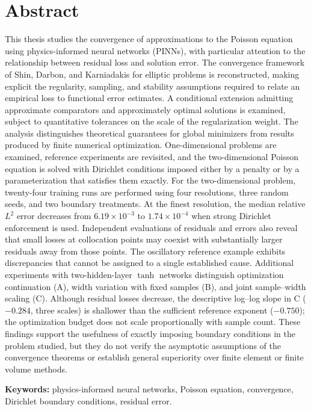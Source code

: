 \clearpage
\chapter*{\centering \large Abstract}

This thesis studies the convergence of approximations to the Poisson equation using physics-informed neural networks (PINNs), with particular attention to the relationship between residual loss and solution error. The convergence framework of Shin, Darbon, and Karniadakis for elliptic problems is reconstructed, making explicit the regularity, sampling, and stability assumptions required to relate an empirical loss to functional error estimates. A conditional extension admitting approximate comparators and approximately optimal solutions is examined, subject to quantitative tolerances on the scale of the regularization weight. The analysis distinguishes theoretical guarantees for global minimizers from results produced by finite numerical optimization. One-dimensional problems are examined, reference experiments are revisited, and the two-dimensional Poisson equation is solved with Dirichlet conditions imposed either by a penalty or by a parameterization that satisfies them exactly. For the two-dimensional problem, twenty-four training runs are performed using four resolutions, three random seeds, and two boundary treatments. At the finest resolution, the median relative $L^2$ error decreases from $6\mathord{.}19\times10^{-3}$ to $1\mathord{.}74\times10^{-4}$ when strong Dirichlet enforcement is used. Independent evaluations of residuals and errors also reveal that small losses at collocation points may coexist with substantially larger residuals away from those points. The oscillatory reference example exhibits discrepancies that cannot be assigned to a single established cause. Additional experiments with two-hidden-layer $\tanh$ networks distinguish optimization continuation (A), width variation with fixed samples (B), and joint sample--width scaling (C). Although residual losses decrease, the descriptive log--log slope in C ($-0.284$, three scales) is shallower than the sufficient reference exponent ($-0.750$); the optimization budget does not scale proportionally with sample count. These findings support the usefulness of exactly imposing boundary conditions in the problem studied, but they do not verify the asymptotic assumptions of the convergence theorems or establish general superiority over finite element or finite volume methods.

\noindent\textbf{Keywords:} physics-informed neural networks, Poisson equation, convergence, Dirichlet boundary conditions, residual error.
